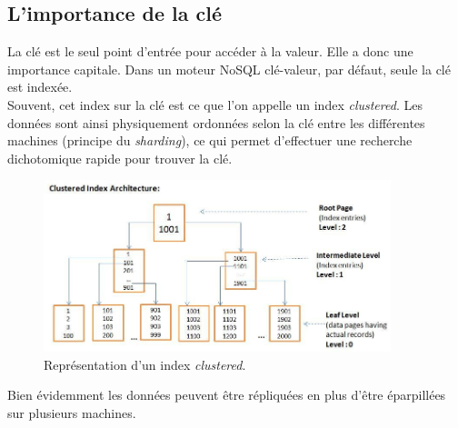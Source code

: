 \subsection{L'importance de la clé}
	La clé est le seul point d'entrée pour accéder à la valeur. Elle a donc une importance capitale. Dans un moteur NoSQL clé-valeur, par défaut, seule la clé est indexée.\\

	Souvent, cet index sur la clé est ce que l'on appelle un index \textit{clustered}. Les données sont ainsi physiquement ordonnées selon la clé entre les différentes machines (principe du \textit{sharding}), ce qui permet d'effectuer une recherche dichotomique rapide pour trouver la clé.

	\begin{figure}[H]
		\centering
		\includegraphics[width=0.9\textwidth]{images/clusteredIndex.jpg}
		\caption{Représentation d'un index \textit{clustered}.}
	\end{figure}

	Bien évidemment les données peuvent être répliquées en plus d'être éparpillées sur plusieurs machines.
